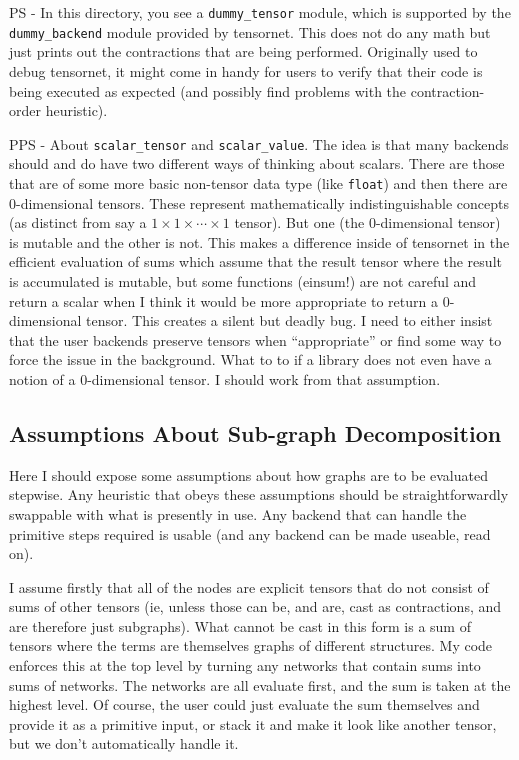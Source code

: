 \documentclass[12pt,letterpaper]{article}
\begin{document}
PS - In this directory, you see a \texttt{dummy\_tensor} module, which is supported by the \texttt{dummy\_backend}
module provided by tensornet.  This does not do any math but just prints out the contractions
that are being performed.  Originally used to debug tensornet, it might come in handy for users
to verify that their code is being executed as expected (and possibly find problems with the
contraction-order heuristic).

PPS - About \texttt{scalar\_tensor} and \texttt{scalar\_value}.  The idea is that many backends
should and do have two different ways of thinking about scalars.  There are those that are of
some more basic non-tensor data type (like \texttt{float}) and then there are 0-dimensional tensors.
These represent mathematically indistinguishable concepts (as distinct from say a $1\times 1\times\cdots\times 1$ tensor).
But one (the 0-dimensional tensor) is mutable and the other is not.
This makes a difference inside of tensornet in the efficient evaluation of sums which assume that the
result tensor where the result is accumulated is mutable, but some functions (einsum!) are not careful
and return a scalar when I think it would be more appropriate to return a 0-dimensional tensor.
This creates a silent but deadly bug.  I need to either insist that the user backends preserve
tensors when ``appropriate'' or find some way to force the issue in the background.
What to to if a library does not even have a notion of a 0-dimensional tensor.  I should work from that assumption.

	\subsection{Assumptions About Sub-graph Decomposition}

Here I should expose some assumptions about how graphs are to be evaluated stepwise.
Any heuristic that obeys these assumptions should be straightforwardly swappable with what is
 presently in use.
Any backend that can handle the primitive steps required is usable (and any backend can be
 made useable, read on).

I assume firstly that all of the nodes are explicit tensors that do not consist of sums of other
 tensors (ie, unless those can be, and are, cast as contractions, and are therefore just subgraphs).
What cannot be cast in this form is a sum of tensors where the terms are themselves graphs of
 different structures.
My code enforces this at the top level by turning any networks that contain sums into sums of networks.
The networks are all evaluate first, and the sum is taken at the highest level.
Of course, the user could just evaluate the sum themselves and provide it as a primitive input,
 or stack it and make it look like another tensor, but we don't automatically handle it.
\end{document}
